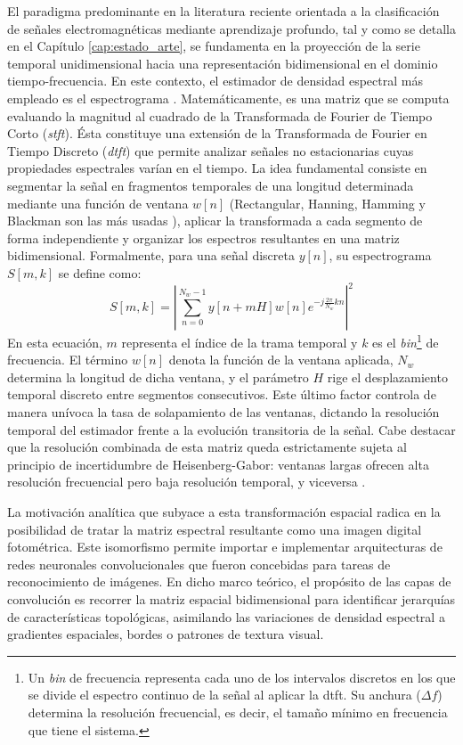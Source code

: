 El paradigma predominante en la literatura reciente orientada a la clasificación de señales electromagnéticas mediante aprendizaje profundo, tal y como se detalla en el Capítulo \ref{cap:estado_arte}, se fundamenta en la proyección de la serie temporal unidimensional hacia una representación bidimensional en el dominio tiempo-frecuencia. En este contexto, el estimador de densidad espectral más empleado es el espectrograma \cite{gluge_robust_2024, zhao_drone_2024}. Matemáticamente, es una matriz que se computa evaluando la magnitud al cuadrado de la Transformada de Fourier de Tiempo Corto (\textit{\gls{stft}}). Ésta constituye una extensión de la Transformada de Fourier en Tiempo Discreto (\textit{\gls{dtft}}) que permite analizar señales no estacionarias cuyas propiedades espectrales varían en el tiempo. La idea fundamental consiste en segmentar la señal en fragmentos temporales de una longitud determinada mediante una función de ventana $w[n]$ (Rectangular, Hanning, Hamming y Blackman son las más usadas \cite{zhang_window, harris_window}), aplicar la transformada a cada segmento de forma independiente y organizar los espectros resultantes en una matriz bidimensional. Formalmente, para una señal discreta $y[n]$, su espectrograma $S[m,k]$ se define como:
\begin{equation}
    S[m,k] = \left| \sum_{n=0}^{N_w-1} y[n+mH] w[n] e^{-j\frac{2\pi}{N_w}kn} \right|^2
    \label{eq:espectrograma}
\end{equation}
En esta ecuación, $m$ representa el índice de la trama temporal y $k$ es el \textit{bin}\footnote{Un \textit{bin} de frecuencia representa cada uno de los intervalos discretos en los que se divide el espectro continuo de la señal al aplicar la \gls{dtft}. Su anchura ($\Delta f$) determina la resolución frecuencial, es decir, el tamaño mínimo en frecuencia que tiene el sistema.} de frecuencia. El término $w[n]$ denota la función de la ventana aplicada, $N_w$ determina la longitud de dicha ventana, y el parámetro $H$ rige el desplazamiento temporal discreto entre segmentos consecutivos. Este último factor controla de manera unívoca la tasa de solapamiento de las ventanas, dictando la resolución temporal del estimador frente a la evolución transitoria de la señal. Cabe destacar que la resolución combinada de esta matriz queda estrictamente sujeta al principio de incertidumbre de Heisenberg-Gabor: ventanas largas ofrecen alta resolución frecuencial pero baja resolución temporal, y viceversa \cite{oppenheim_discrete_2014}.

La motivación analítica que subyace a esta transformación espacial radica en la posibilidad de tratar la matriz espectral resultante como una imagen digital fotométrica. Este isomorfismo permite importar e implementar arquitecturas de redes neuronales convolucionales que fueron concebidas para tareas de reconocimiento de imágenes. En dicho marco teórico, el propósito de las capas de convolución es recorrer la matriz espacial bidimensional para identificar jerarquías de características topológicas, asimilando las variaciones de densidad espectral a gradientes espaciales, bordes o patrones de textura visual. 

